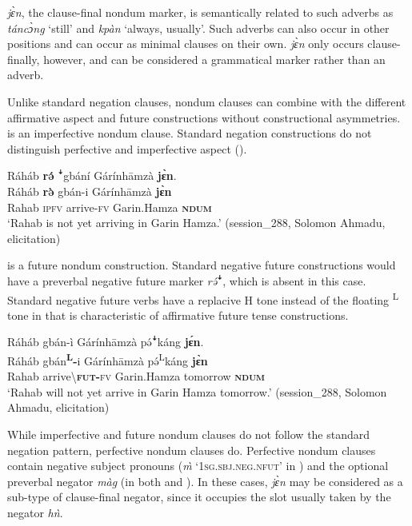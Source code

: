 \documentclass[output=paper,colorlinks,citecolor=brown]{langscibook}
\begin{document}
\textit{jɛ̀n}, the clause-final nondum marker, is semantically related to such adverbs as \textit{táncɔ̀ng} ‘still’ and \textit{kpàn} ‘always, usually’. Such adverbs can also occur in other positions and can occur as minimal clauses on their own. \textit{jɛ̀n} only occurs clause-finally, however, and can be considered a grammatical marker rather than an adverb.

Unlike standard negation clauses, nondum clauses can combine with the different affirmative aspect and future constructions without constructional asymmetries.  is an imperfective nondum clause. Standard negation constructions do not distinguish perfective and imperfective aspect ().

\ea\label{ex:kam:59} 
    \glll Ráháb \textbf{rə́} ꜜgbání Gárínhāmzà \textbf{jɛ̀n}.\\
        Ráháb \textbf{rə̀} gbán-i Gárínhāmzà \textbf{jɛ̀n}\\
        Rahab \textsc{ipfv} arrive-\textsc{fv} Garin.Hamza \textbf{\textsc{ndum}}\\
    \glt ‘Rahab is not yet arriving in Garin Hamza.’ (session\_288, Solomon Ahmadu, elicitation)
\z 

 is a future nondum construction. Standard negative future constructions would have a preverbal negative future marker \textit{rə́}ꜜ, which is absent in this case. Standard negative future verbs have a replacive H tone instead of the floating \textsuperscript{L} tone in  that is characteristic of affirmative future tense constructions.

\ea\label{ex:kam:60} 
    \glll Ráháb gbán-ì Gárínhāmzà pə́ꜜkáng \textbf{jɛ́n}.\\
        Ráháb gbán\textbf\textsuperscript{L}\textbf{{}-}i Gárínhāmzà pə́\textsuperscript{L}káng \textbf{jɛ̀n}\\
        Rahab arrive{\textbackslash}\textbf{\textsc{fut}}\textbf{{}-}\textsc{fv} Garin.Hamza tomorrow \textbf{\textsc{ndum}}\\
    \glt ‘Rahab will not yet arrive in Garin Hamza tomorrow.’ (session\_288, Solomon Ahmadu, elicitation)
\z 

While imperfective and future nondum clauses do not follow the standard negation pattern, perfective nondum clauses do. Perfective nondum clauses contain negative subject pronouns (\textit{\`{m}} ‘1\textsc{sg}.\textsc{sbj.neg}.\textsc{nfut}’ in ) and the optional preverbal negator \textit{màg} (in both  and ). In these cases, \textit{jɛ̀n} may be considered as a sub-type of clause-final negator, since it occupies the slot usually taken by the negator \textit{hǹ}.
\end{document}
